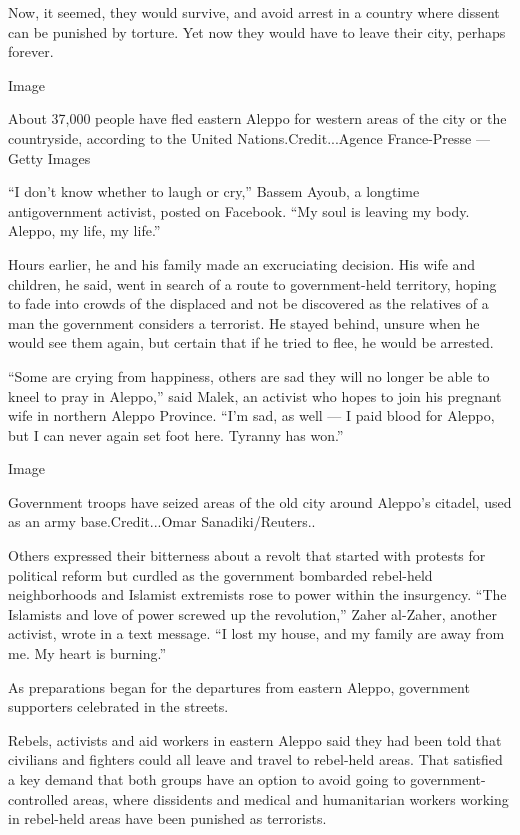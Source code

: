 Now, it seemed, they would survive, and avoid arrest in a country where
dissent can be punished by torture. Yet now they would have to leave
their city, perhaps forever.

Image

About 37,000 people have fled eastern Aleppo for western areas of the
city or the countryside, according to the United Nations.Credit...Agence
France-Presse --- Getty Images

``I don't know whether to laugh or cry,'' Bassem Ayoub, a longtime
antigovernment activist, posted on Facebook. ``My soul is leaving my
body. Aleppo, my life, my life.''

Hours earlier, he and his family made an excruciating decision. His wife
and children, he said, went in search of a route to government-held
territory, hoping to fade into crowds of the displaced and not be
discovered as the relatives of a man the government considers a
terrorist. He stayed behind, unsure when he would see them again, but
certain that if he tried to flee, he would be arrested.

``Some are crying from happiness, others are sad they will no longer be
able to kneel to pray in Aleppo,'' said Malek, an activist who hopes to
join his pregnant wife in northern Aleppo Province. ``I'm sad, as well
--- I paid blood for Aleppo, but I can never again set foot here.
Tyranny has won.''

Image

Government troops have seized areas of the old city around Aleppo's
citadel, used as an army base.Credit...Omar Sanadiki/Reuters..

Others expressed their bitterness about a revolt that started with
protests for political reform but curdled as the government bombarded
rebel-held neighborhoods and Islamist extremists rose to power within
the insurgency. ``The Islamists and love of power screwed up the
revolution,'' Zaher al-Zaher, another activist, wrote in a text message.
``I lost my house, and my family are away from me. My heart is
burning.''

As preparations began for the departures from eastern Aleppo, government
supporters celebrated in the streets.

Rebels, activists and aid workers in eastern Aleppo said they had been
told that civilians and fighters could all leave and travel to
rebel-held areas. That satisfied a key demand that both groups have an
option to avoid going to government-controlled areas, where dissidents
and medical and humanitarian workers working in rebel-held areas have
been punished as terrorists.

